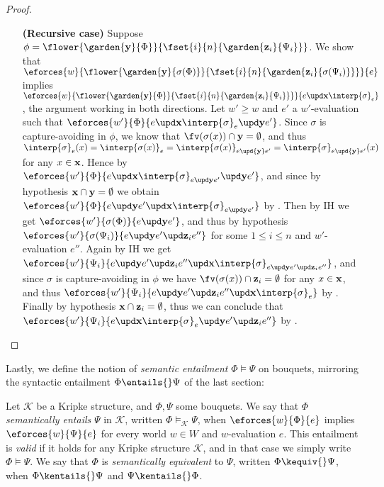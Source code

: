 \begin{proof}
\begin{itemize}
    \item[\textbf{(Recursive case)}]
    Suppose $\phi =
    \flower{\garden{\by}{\Phi}}{\fset{i}{n}{\garden{\bz_i}{\Psi_i}}}$. We show
    that
    $\eforces{w}{\flower{\garden{\by}{\sigma(\Phi)}}{\fset{i}{n}{\garden{\bz_i}{\sigma(\Psi_i)}}}}{e}$
    implies
    $\eforces{w}{\flower{\garden{\by}{\Phi}}{\fset{i}{n}{\garden{\bz_i}{\Psi_i}}}}{\update{e}{\bx}{\interp{\sigma}}_e}$,
    the argument working in both directions. Let $w' \geq w$ and $e'$ a
    $w'$-evaluation such that
    $\eforces{w'}{\Phi}{\update{e}{\bx}{\update{\interp{\sigma}_e}{\by}{e'}}}$.
    Since $\sigma$ is capture-avoiding in $\phi$, we know that $\fv(\sigma(x))
    \cap \by = \emptyset$, and thus $\interp{\sigma}_e(x) =
    \interp{\sigma(x)}_{e} = \interp{\sigma(x)}_{e \upd{\by} e'} =
    \interp{\sigma}_{e \upd{\by} e'}(x)$ for any $x \in \mathbf{x}$. Hence by
    $\eforces{w'}{\Phi}{\update{e}{\bx}{\update{\interp{\sigma}_{\update{e}{\by}{e'}}}{\by}{e'}}}$,
    and since by hypothesis $\mathbf{x} \cap \mathbf{y} = \emptyset$ we obtain
    $\eforces{w'}{\Phi}{\update{e}{\by}{\update{e'}{\bx}{\interp{\sigma}_{\update{e}{\by}{e'}}}}}$
    by . Then by IH we get
    $\eforces{w'}{\sigma(\Phi)}{\update{e}{\by}{e'}}$, and thus by hypothesis
    $\eforces{w'}{\sigma(\Psi_i)}{\update{e}{\by}{\update{e'}{\bz_i}{e''}}}$ for
    some $1 \leq i \leq n$ and $w'$-evaluation $e''$. Again by IH we get
    $\eforces{w'}{\Psi_i}{\update{e}{\by}{\update{e'}{\bz_i}{\update{e''}{\bx}{\interp{\sigma}_{\update{e}{\by}{\update{e'}{\bz_i}{e''}}}}}}}$,
    and since $\sigma$ is capture-avoiding in $\phi$ we have $\fv(\sigma(x))
    \cap \bz_i = \emptyset$ for any $x \in \mathbf{x}$, and thus
    $\eforces{w'}{\Psi_i}{\update{e}{\by}{\update{e'}{\bz_i}{\update{e''}{\bx}{\interp{\sigma}_{e}}}}}$
    by . Finally by hypothesis $\mathbf{x} \cap \mathbf{z}_i =
    \emptyset$, thus we can conclude that
    $\eforces{w'}{\Psi_i}{\update{e}{\bx}{\update{\interp{\sigma}_{e}}{\by}{\update{e'}{\bz_i}{e''}}}}$
    by .
  \end{itemize}
\end{proof}

Lastly, we define the notion of \emph{semantic entailment} $\Phi \vDash \Psi$ on
bouquets, mirroring the syntactic entailment $\Phi \entails{} \Psi$ of the last
section:

\begin{definition}
  Let $\mathcal{K}$ be a Kripke structure, and $\Phi, \Psi$ some bouquets. We
  say that $\Phi$ \emph{semantically entails} $\Psi$ in $\mathcal{K}$, written
  $\Phi \vDash_{\mathcal{K}} \Psi$, when $\eforces{w}{\Phi}{e}$ implies
  $\eforces{w}{\Psi}{e}$ for every world $w \in W$ and $w$-evaluation $e$. This
  entailment is \emph{valid} if it holds for any Kripke structure $\mathcal{K}$,
  and in that case we simply write $\Phi \vDash \Psi$. We say that $\Phi$ is
  \emph{semantically equivalent} to $\Psi$, written $\Phi \kequiv{} \Psi$, when
  $\Phi \kentails{}\Psi$ and $\Psi \kentails{}\Phi$.
\end{definition}

